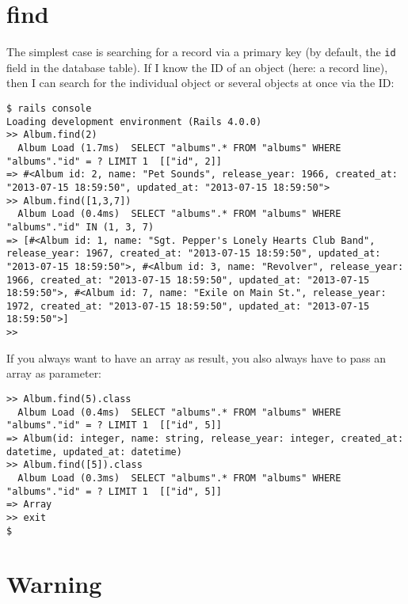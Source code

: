\documentclass[a4paper]{book}
\newcounter{tab}[chapter]
\begin{document}
\section{find}\label{find}

The simplest case is searching for a record via a primary key (by default, the \texttt{id} field in the database table). If I know the ID of an object (here: a record line), then I can search for the individual object or several objects at once via the ID:

\begin{shaded}\begin{verbatim}
$ rails console
Loading development environment (Rails 4.0.0)
>> Album.find(2)
  Album Load (1.7ms)  SELECT "albums".* FROM "albums" WHERE "albums"."id" = ? LIMIT 1  [["id", 2]]
=> #<Album id: 2, name: "Pet Sounds", release_year: 1966, created_at: "2013-07-15 18:59:50", updated_at: "2013-07-15 18:59:50">
>> Album.find([1,3,7])
  Album Load (0.4ms)  SELECT "albums".* FROM "albums" WHERE "albums"."id" IN (1, 3, 7)
=> [#<Album id: 1, name: "Sgt. Pepper's Lonely Hearts Club Band", release_year: 1967, created_at: "2013-07-15 18:59:50", updated_at: "2013-07-15 18:59:50">, #<Album id: 3, name: "Revolver", release_year: 1966, created_at: "2013-07-15 18:59:50", updated_at: "2013-07-15 18:59:50">, #<Album id: 7, name: "Exile on Main St.", release_year: 1972, created_at: "2013-07-15 18:59:50", updated_at: "2013-07-15 18:59:50">]
>>  
\end{verbatim}\end{shaded}

If you always want to have an array as result, you also always have to pass an array as parameter:

\begin{shaded}\begin{verbatim}
>> Album.find(5).class
  Album Load (0.4ms)  SELECT "albums".* FROM "albums" WHERE "albums"."id" = ? LIMIT 1  [["id", 5]]
=> Album(id: integer, name: string, release_year: integer, created_at: datetime, updated_at: datetime)
>> Album.find([5]).class
  Album Load (0.3ms)  SELECT "albums".* FROM "albums" WHERE "albums"."id" = ? LIMIT 1  [["id", 5]]
=> Array
>> exit
$
\end{verbatim}\end{shaded}

\section{Warning}\label{warning-1}
\end{document}
